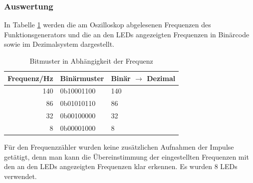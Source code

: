 \documentclass[12pt,a4paper]{article}
\begin{document}
\subsubsection*{Auswertung}
In Tabelle \ref{tab:frequ} werden die am Oszilloskop abgelesenen Frequenzen des Funktionsgenerators und die an den LEDs angezeigten Frequenzen in Binärcode sowie im Dezimalsystem dargestellt.
\begin{table}[H]
\begin{center}
\begin{tabular}{|r|l|l|}
	\hline
	\multicolumn{1}{|l|}{Frequenz/Hz} & Binärmuster & Binär $\rightarrow$ Dezimal \\ \hline\hline
	                              140 & 0b10001100  & 140                         \\ \hline
	                               86 & 0b01010110  & 86                          \\ \hline
	                               32 & 0b00100000  & 32                          \\ \hline
	                                8 & 0b00001000  & 8                           \\ \hline
\end{tabular}
\end{center}
\caption{Bitmuster in Abhängigkeit der Frequenz}
\label{tab:frequ}
\end{table}
Für den Frequenzzähler wurden keine zusätzlichen Aufnahmen der Impulse getätigt, denn man kann die Übereinstimmung der eingestellten Frequenzen mit den an den LEDs angezeigten Frequenzen klar erkennen. Es wurden 8 LEDs verwendet.
\end{document}

